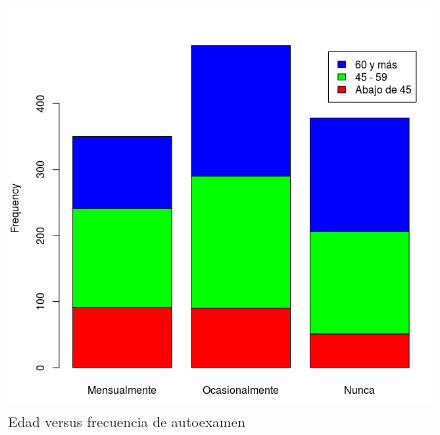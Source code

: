 \documentclass[11pt,evaluacion]{uescimat}
\begin{document}
\begin{problema}
\begin{figure}[H]
\begin{centering}
\includegraphics[scale=0.30]{imagen4.png}
\par\end{centering}
\caption{Edad versus frecuencia de autoexamen}
\end{figure}




\end{problema}
\end{document}
